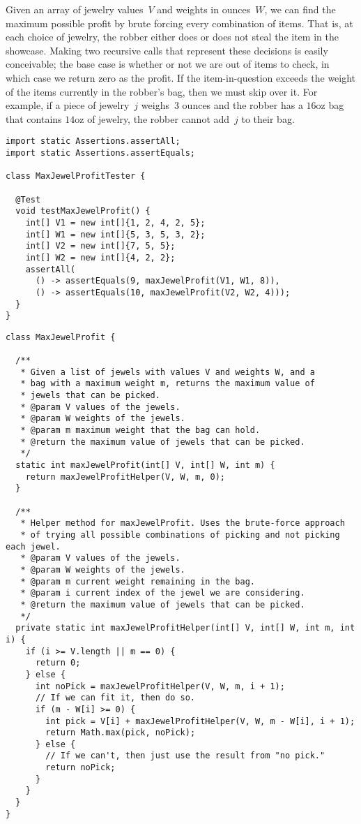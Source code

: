Given an array of jewelry values~$V$ and weights in ounces~$W$, we can find the maximum possible profit by brute forcing every combination of items. 
That is, at each choice of jewelry, the robber either does or does not steal the item in the showcase. 
Making two recursive calls that represent these decisions is easily conceivable; 
the base case is whether or not we are out of items to check, in which case we return zero as the profit. 
If the item-in-question exceeds the weight of the items currently in the robber's bag, then we must skip over it. 
For example, if a piece of jewelry~$j$ weighs~$3$ ounces and the robber has a $16\text{oz}$ bag that contains $14\text{oz}$ of jewelry, the robber cannot add~$j$ to their bag.

\begin{lstlisting}[language=MyJava]
import static Assertions.assertAll;
import static Assertions.assertEquals;

class MaxJewelProfitTester {

  @Test
  void testMaxJewelProfit() {
    int[] V1 = new int[]{1, 2, 4, 2, 5};
    int[] W1 = new int[]{5, 3, 5, 3, 2};
    int[] V2 = new int[]{7, 5, 5};
    int[] W2 = new int[]{4, 2, 2};
    assertAll(
      () -> assertEquals(9, maxJewelProfit(V1, W1, 8)),
      () -> assertEquals(10, maxJewelProfit(V2, W2, 4)));
  }
}
\end{lstlisting}

\enlargethispage{-2\baselineskip}
\begin{lstlisting}[language=MyJava]
class MaxJewelProfit {

  /**
   * Given a list of jewels with values V and weights W, and a 
   * bag with a maximum weight m, returns the maximum value of 
   * jewels that can be picked.
   * @param V values of the jewels.
   * @param W weights of the jewels.
   * @param m maximum weight that the bag can hold.
   * @return the maximum value of jewels that can be picked.
   */
  static int maxJewelProfit(int[] V, int[] W, int m) {
    return maxJewelProfitHelper(V, W, m, 0);
  }

  /**
   * Helper method for maxJewelProfit. Uses the brute-force approach 
   * of trying all possible combinations of picking and not picking each jewel.
   * @param V values of the jewels.
   * @param W weights of the jewels.
   * @param m current weight remaining in the bag.
   * @param i current index of the jewel we are considering.
   * @return the maximum value of jewels that can be picked.
   */
  private static int maxJewelProfitHelper(int[] V, int[] W, int m, int i) {
    if (i >= V.length || m == 0) {
      return 0;
    } else {
      int noPick = maxJewelProfitHelper(V, W, m, i + 1);
      // If we can fit it, then do so.
      if (m - W[i] >= 0) {
        int pick = V[i] + maxJewelProfitHelper(V, W, m - W[i], i + 1);
        return Math.max(pick, noPick);
      } else {
        // If we can't, then just use the result from "no pick."
        return noPick;
      }
    }
  }
}
\end{lstlisting}

